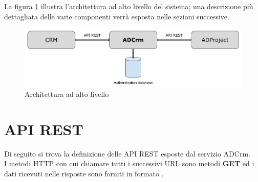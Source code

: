 La figura \ref{fig:architetturasistema} illustra l'architettura ad alto livello del sistema; una descrizione più dettagliata delle varie componenti verrà esposta nelle sezioni successive.

\begin{figure}[H]
	\centering
	\includegraphics[width=\linewidth]{images/architettura_sistema}
	\caption{Architettura ad alto livello}
	\label{fig:architetturasistema}
\end{figure}

\section{API REST}
Di seguito si trova la definizione delle API REST esposte dal servizio ADCrm.\\
I metodi HTTP con cui chiamare tutti i successivi URL sono metodi \textbf{GET} ed i dati ricevuti nelle risposte sono forniti in formato .

